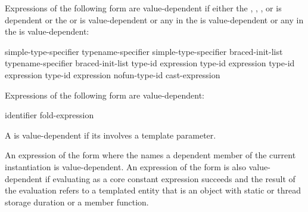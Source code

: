 \pnum
Expressions of the following form are value-dependent if either the
,
,
, or
is dependent or the
or
is value-dependent or
any  in the 
is value-dependent or
any  in the 
is value-dependent:

\begin{ncsimplebnf}
simple-type-specifier \terminal{(}  \terminal{)}\br
typename-specifier \terminal{(}  \terminal{)}\br
simple-type-specifier braced-init-list\br
typename-specifier braced-init-list\br
{} \terminal{<} type-id \terminal{>} \terminal{(} expression \terminal{)}\br
{} \terminal{<} type-id \terminal{>} \terminal{(} expression \terminal{)}\br
{} \terminal{<} type-id \terminal{>} \terminal{(} expression \terminal{)}\br
{} \terminal{<} type-id \terminal{>} \terminal{(} expression \terminal{)}\br
\terminal{(} nofun-type-id \terminal{)} cast-expression
\end{ncsimplebnf}

\pnum
Expressions of the following form are value-dependent:

\begin{ncsimplebnf}
  \terminal{(} identifier \terminal{)}\br
fold-expression
\end{ncsimplebnf}

\pnum
A 
is value-dependent if
its  involves a template parameter.

\pnum
An expression of the form \tcode{\&} where the
 names a dependent member of the current
instantiation is value-dependent.
An expression of the form \tcode{\&}
is also value-dependent if evaluating 
as a core constant expression succeeds and
the result of the evaluation refers to a templated entity
that is an object with static or thread storage duration or a member function.

